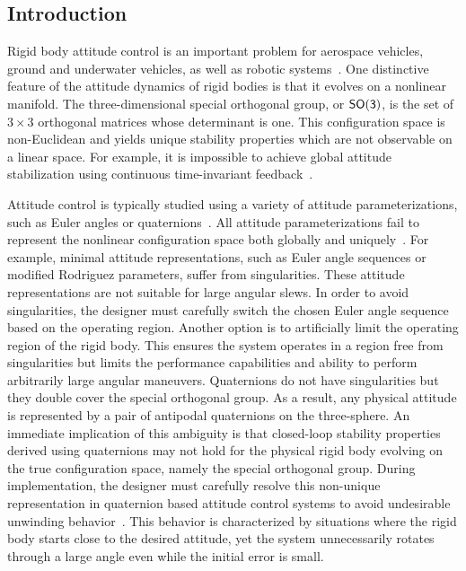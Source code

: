 \documentclass[10pt,fleqn]{IJCAS}  %
\begin{document}


\begin{multicols}{2}
\section{Introduction}\label{sec:intro}

Rigid body attitude control is an important problem for aerospace vehicles, ground and underwater vehicles, as well as robotic systems~\cite{hughes2004,wertz1978}.
One distinctive feature of the attitude dynamics of rigid bodies is that it evolves on a nonlinear manifold.
The three-dimensional special orthogonal group, or \( \mathsf{SO(3)} \), is the set of \( 3 \times 3 \) orthogonal matrices whose determinant is one.
This configuration space is non-Euclidean and yields unique stability properties which are not observable on a linear space.
For example, it is impossible to achieve global attitude stabilization using continuous time-invariant feedback~\cite{bhat2000}.



Attitude control is typically studied using a variety of attitude parameterizations, such as Euler angles or quaternions~\cite{shuster1993}.
All attitude parameterizations fail to represent the nonlinear configuration space both globally and uniquely~\cite{chaturvedi2011a}.
For example, minimal attitude representations, such as Euler angle sequences or modified Rodriguez parameters, suffer from singularities.
These attitude representations are not suitable for large angular slews.
In order to avoid singularities, the designer must carefully switch the chosen Euler angle sequence based on the operating region.
Another option is to artificially limit the operating region of the rigid body.
This ensures the system operates in a region free from singularities but limits the performance capabilities and ability to perform arbitrarily large angular maneuvers.
Quaternions do not have singularities but they double cover the special orthogonal group.
As a result, any physical attitude is represented by a pair of antipodal quaternions on the three-sphere.
An immediate implication of this ambiguity is that closed-loop stability properties derived using quaternions may not hold for the physical rigid body evolving on the true configuration space, namely the special orthogonal group.
During implementation, the designer must carefully resolve this non-unique representation in quaternion based attitude control systems to avoid undesirable unwinding behavior~\cite{bhat2000}.
This behavior is characterized by situations where the rigid body starts close to the desired attitude, yet the system unnecessarily rotates through a large angle even while the initial error is small.


\end{multicols}
\end{document}
